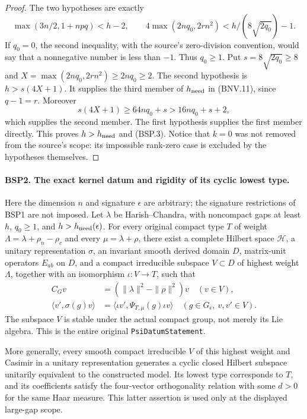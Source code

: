 \documentclass[11pt,a4paper]{article}
\numberwithin{equation}{section}
\theoremstyle{remark}\newtheorem{remark}[theorem]{Remark}
\begin{document}
\begin{proof}
The two hypotheses are exactly
\[
 \max(3n/2,1+npq)<h-2,\qquad
 4\max(2nq_0,2rn^2)<h/(8\sqrt{2q_0})-1.
\]
If $q_0=0$, the second inequality, with the source's zero-division
convention, would say that a nonnegative number is less than $-1$.
Thus $q_0\ge1$.  Put $s=8\sqrt{2q_0}\ge8$ and
$X=\max(2nq_0,2rn^2)\ge2nq_0\ge2$.
The second hypothesis is $h>s(4X+1)$.
It supplies the third member of $h_{\rm need}$ in (BNV.11), since
$q-1=r$.  Moreover
\[
 s(4X+1)\ge64nq_0+s>16nq_0+s+2,
\]
which supplies the second member.  The first hypothesis supplies the
first member directly.  This proves $h>h_{\rm need}$ and (BSP.3).
Notice that $k=0$ was not removed from the source's scope: its impossible
rank-zero case is excluded by the hypotheses themselves.
\end{proof}

\paragraph{BSP2. The exact kernel datum and rigidity of its cyclic lowest type.}
\label{claim:BSP2}
Here the dimension $n$ and signature $\epsilon$ are arbitrary; the
signature restrictions of BSP1 are not imposed.
Let $\lambda$ be Harish--Chandra, with noncompact gaps at least $h$,
$q_0\ge1$, and $h>h_{\rm need}(\epsilon)$.
For every original compact type $T$ of weight
$\Lambda=\lambda+\rho_n-\rho_c$ and every $\mu=\lambda+\rho$, there
exist a complete Hilbert space $\mathcal H$, a unitary representation
$\sigma$, an invariant smooth derived domain $D$, matrix-unit operators
$E_{ab}$ on $D$, and a compact irreducible subspace $V\subset D$ of
highest weight $\Lambda$, together with an isomorphism $\iota:V\to T$,
such that
\[
 \begin{split}
 C_Gv&=(\|\lambda\|^2-\|\rho\|^2)v\quad(v\in V),\\
 \langle v',\sigma(g)v\rangle
   &=\langle\iota v',\Psi_{T,\mu}(g)\iota v\rangle
       \quad(g\in G_\epsilon,\ v,v'\in V).
 \end{split}
 \tag{BSP.4}
\]
The subspace $V$ is stable under the actual compact group, not merely its
Lie algebra.  This is the entire original \texttt{Psi\allowbreak Datum\allowbreak Statement}.

More generally, every smooth compact irreducible $V$ of this highest
weight and Casimir in a unitary representation generates a cyclic closed
Hilbert subspace unitarily equivalent to the constructed model.
Its lowest type corresponds to $T$, and its coefficients satisfy the
four-vector orthogonality relation with some $d>0$ for the same Haar
measure.  This latter assertion is used only at the displayed
large-gap scope.
\end{document}
